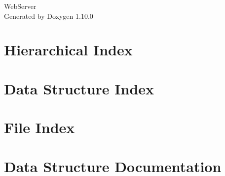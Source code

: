 \documentclass[twoside]{book}
\newcommand{\+}{\discretionary{\mbox{\scriptsize$\hookleftarrow$}}{}{}}
\newcommand{\clearemptydoublepage}{%
    \newpage{\pagestyle{empty}\cleardoublepage}%
  }
\begin{document}
  \raggedbottom
    \hypersetup{pageanchor=false,
                bookmarksnumbered=true,
                pdfencoding=unicode
               }
  \begin{titlepage}
  \vspace*{7cm}
  \begin{center}%
  {\Large Web\+Server}\\
  \vspace*{1cm}
  {\large Generated by Doxygen 1.10.0}\\
  \end{center}
  \end{titlepage}
  \clearemptydoublepage
  \tableofcontents
  \clearemptydoublepage
  \hypersetup{pageanchor=true}
\chapter{Hierarchical Index}

\chapter{Data Structure Index}

\chapter{File Index}

\chapter{Data Structure Documentation}
























\end{document}
